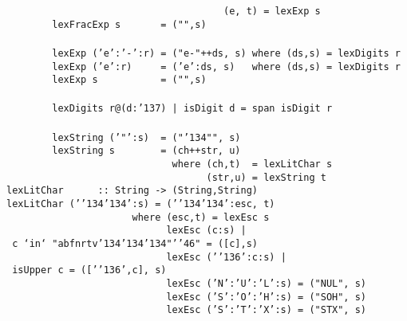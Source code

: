 \mbox{\tt \ \ \ \ \ \ \ \ \ \ \ \ \ \ \ \ \ \ \ \ \ \ \ \ \ \ \ \ \ \ \ \ \ \ \ \ \ \ (e,\ t)\ =\ lexExp\ s}\\
\mbox{\tt \ \ \ \ \ \ \ \ lexFracExp\ s\ \ \ \ \ \ \ =\ ("",s)}\\
\mbox{\tt }\\
\mbox{\tt \ \ \ \ \ \ \ \ lexExp\ ('e':'-':r)\ =\ ("e-"++ds,\ s)\ where\ (ds,s)\ =\ lexDigits\ r}\\
\mbox{\tt \ \ \ \ \ \ \ \ lexExp\ ('e':r)\ \ \ \ \ =\ ('e':ds,\ s)\ \ \ where\ (ds,s)\ =\ lexDigits\ r}\\
\mbox{\tt \ \ \ \ \ \ \ \ lexExp\ s\ \ \ \ \ \ \ \ \ \ \ =\ ("",s)}\\
\mbox{\tt }\\
\mbox{\tt \ \ \ \ \ \ \ \ lexDigits\ r@(d:{\char'137})\ |\ isDigit\ d\ =\ span\ isDigit\ r}\\
\mbox{\tt }\\
\mbox{\tt \ \ \ \ \ \ \ \ lexString\ ('"':s)\ \ =\ ("{\char'134}"",\ s)}\\
\mbox{\tt \ \ \ \ \ \ \ \ lexString\ s\ \ \ \ \ \ \ \ =\ (ch++str,\ u)}\\
\mbox{\tt \ \ \ \ \ \ \ \ \ \ \ \ \ \ \ \ \ \ \ \ \ \ \ \ \ \ \ \ \ where\ (ch,t)\ \ =\ lexLitChar\ s}\\
\mbox{\tt \ \ \ \ \ \ \ \ \ \ \ \ \ \ \ \ \ \ \ \ \ \ \ \ \ \ \ \ \ \ \ \ \ \ \ (str,u)\ =\ lexString\ t}
%
%
\eprogB\noindent\bprogB
\mbox{\tt lexLitChar\ \ \ \ \ \ ::\ String\ ->\ (String,String)}\\
\mbox{\tt lexLitChar\ ('{\char'134}{\char'134}':s)\ =\ ('{\char'134}{\char'134}':esc,\ t)}\\
\mbox{\tt \ \ \ \ \ \ \ \ \ \ \ \ \ \ \ \ \ \ \ \ \ \ where\ (esc,t)\ =\ lexEsc\ s}\\
\mbox{\tt \ \ \ \ \ \ \ \ \ \ \ \ \ \ \ \ \ \ \ \ \ \ \ \ \ \ \ \ lexEsc\ (c:s)\ |\ c\ `in`\ "abfnrtv{\char'134}{\char'134}{\char'134}"'{\char'46}"\ =\ ([c],s)}\\
\mbox{\tt \ \ \ \ \ \ \ \ \ \ \ \ \ \ \ \ \ \ \ \ \ \ \ \ \ \ \ \ lexEsc\ ('{\char'136}':c:s)\ |\ isUpper\ c\ =\ (['{\char'136}',c],\ s)}\\
\mbox{\tt \ \ \ \ \ \ \ \ \ \ \ \ \ \ \ \ \ \ \ \ \ \ \ \ \ \ \ \ lexEsc\ ('N':'U':'L':s)\ =\ ("NUL",\ s)}\\
\mbox{\tt \ \ \ \ \ \ \ \ \ \ \ \ \ \ \ \ \ \ \ \ \ \ \ \ \ \ \ \ lexEsc\ ('S':'O':'H':s)\ =\ ("SOH",\ s)}\\
\mbox{\tt \ \ \ \ \ \ \ \ \ \ \ \ \ \ \ \ \ \ \ \ \ \ \ \ \ \ \ \ lexEsc\ ('S':'T':'X':s)\ =\ ("STX",\ s)}\\

